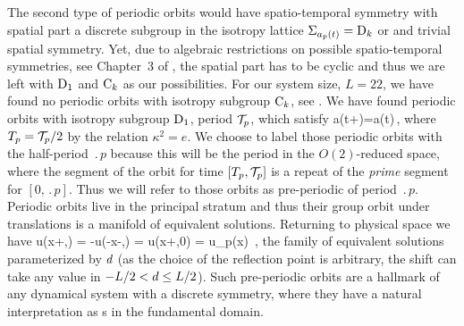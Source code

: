The second type of periodic orbits would have spatio-temporal symmetry
with spatial part a discrete subgroup in the isotropy lattice
$\Sigma_{a_p(t)}=\mathrm{D}_{k}$ or  and trivial spatial symmetry.
Yet, due
to algebraic restrictions on possible spatio-temporal
symmetries, see Chapter~3 of , the
spatial part has to be cyclic and thus we are left with
$\mathrm{D}_{1}$ and $\mathrm{C}_{k}$ as our possibilities. For our system
size, $L=22$, we have found no periodic orbits with isotropy
subgroup $\mathrm{C}_{k}$, see . We have found
periodic orbits with isotropy subgroup $\mathrm{D}_{1}$, period
${\mathcal{T}_{p}}$, which satisfy
\beq
	\Refl a(t+)=a(t)\,,
	\label{eq:ppo}
\eeq
where ${T_{p}}={\mathcal{T}_{p}}/2$ by the relation $\kappa^2=e$. We choose to label those
periodic orbits with the half-period $\period{p}$ because this will be the period in the $O(2)$-reduced space,
where the segment of the orbit for time $[{T_{p}},{\mathcal{T}_{p}}]$ is a repeat of the \emph{prime} segment
for $[0,\period{p}]$. Thus we will refer to those orbits as pre-periodic of period $\period{p}$.
Periodic orbits  live in the principal stratum and thus their group orbit under translations  is a manifold of equivalent solutions. Returning to physical space we have
\beq
  \Refl u(x+\shift,) =
  -u(-x-\shift,) = u(x+\shift,0) = u_p(x)
  \,,
\label{KSpos}
\eeq
the family of equivalent solutions
parameterized by $d$
(as the choice of the reflection point is arbitrary,
the shift can take any value in $-L/2 < d \leq L/2$).
Such pre-periodic orbits
are a hallmark of any dynamical system with a discrete
symmetry, where they have a natural
interpretation as \po s in the
fundamental domain.

